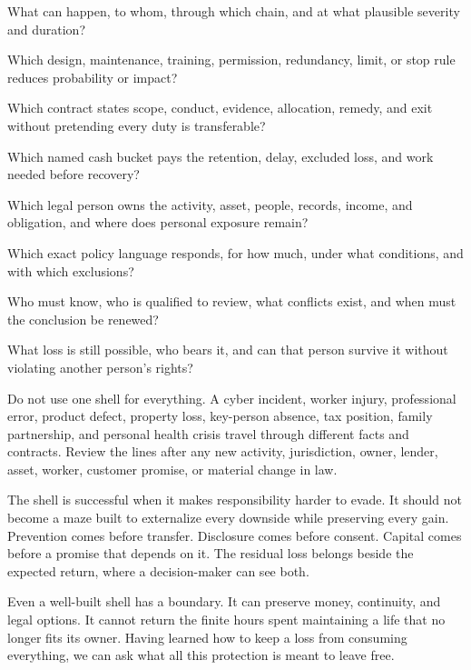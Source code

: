 \begin{description}[leftmargin=2.8em,style=nextline]
\item[Loss] What can happen, to whom, through which chain, and at what plausible
  severity and duration?
\item[Prevention] Which design, maintenance, training, permission, redundancy,
  limit, or stop rule reduces probability or impact?
\item[Promise] Which contract states scope, conduct, evidence, allocation,
  remedy, and exit without pretending every duty is transferable?
\item[Reserve] Which named cash bucket pays the retention, delay, excluded
  loss, and work needed before recovery?
\item[Entity] Which legal person owns the activity, asset, people, records,
  income, and obligation, and where does personal exposure remain?
\item[Insurance] Which exact policy language responds, for how much, under what
  conditions, and with which exclusions?
\item[Disclosure and advice] Who must know, who is qualified to review, what
  conflicts exist, and when must the conclusion be renewed?
\item[Residual] What loss is still possible, who bears it, and can that person
  survive it without violating another person's rights?
\end{description}

Do not use one shell for everything. A cyber incident, worker injury,
professional error, product defect, property loss, key-person absence, tax
position, family partnership, and personal health crisis travel through
different facts and contracts. Review the lines after any new activity,
jurisdiction, owner, lender, asset, worker, customer promise, or material
change in law.

The shell is successful when it makes responsibility harder to evade. It
should not become a maze built to externalize every downside while preserving
every gain. Prevention comes before transfer. Disclosure comes before consent.
Capital comes before a promise that depends on it. The residual loss belongs
beside the expected return, where a decision-maker can see both.

Even a well-built shell has a boundary. It can preserve money, continuity, and
legal options. It cannot return the finite hours spent maintaining a life that
no longer fits its owner. Having learned how to keep a loss from consuming
everything, we can ask what all this protection is meant to leave free.
